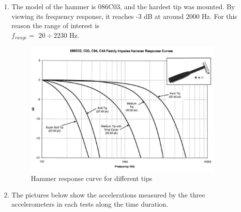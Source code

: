 \documentclass[11pt,a4paper]{article}
\begin{document}
\begin{enumerate}
	
	\item The model of the hammer is 086C03, and the hardest tip was mounted. By viewing its frequency response, it reaches -3 dB at around 2000 Hz. For this reason the range of interest is\\ $f_{range} =$ {$20\div2230$} Hz.
	\begin{figure}[H]
		\centering
		\includegraphics[width=100mm]{images/hammer.png}
		\caption{Hammer response curve for different tips}
	\end{figure}
	
	\medskip
	
	\item The pictures below show the accelerations measured by the three accelerometers in each tests along the time duration.
	

\end{enumerate}
\end{document}
